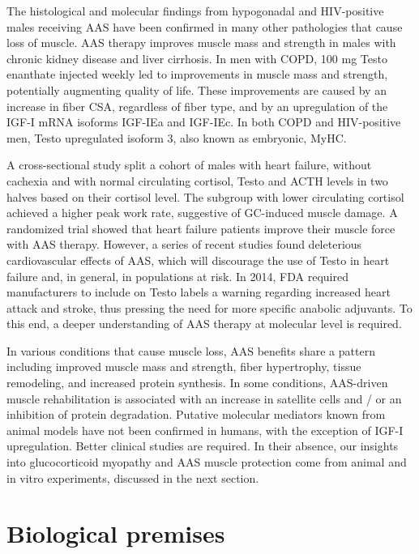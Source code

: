 \documentclass[12pt,english]{report}\usepackage[]{graphicx}\usepackage[]{color}
\begin{document}
The histological and molecular findings from hypogonadal and HIV-positive
males receiving AAS have been confirmed in many other pathologies
that cause loss of muscle. AAS therapy improves muscle mass and strength
in males with chronic kidney disease and liver cirrhosis\citep{macdonald2007nandrolone,yurci2011effects}.
In men with COPD, 100 mg Testo enanthate injected weekly led to improvements
in muscle mass and strength, potentially augmenting quality of life\citep{casaburi2004effects}.
These improvements are caused by an increase in fiber CSA, regardless
of fiber type, and by an upregulation of the IGF-I mRNA isoforms IGF-IEa
and IGF-IEc\citep{lewis2007skeletal}. In both COPD and HIV-positive
men, Testo upregulated isoform 3, also known as embryonic, MyHC.

A cross-sectional study split a cohort of males with heart failure,
without cachexia and with normal circulating cortisol, Testo and ACTH
levels in two halves based on their cortisol level. The subgroup with
lower circulating cortisol achieved a higher peak work rate, suggestive
of GC-induced muscle damage\citep{agapitou2013hormonal}. A randomized
trial showed that heart failure patients improve their muscle force
with AAS therapy\citep{mirdamadi2014beneficial,stout2012testosterone}.
However, a series of recent studies found deleterious cardiovascular
effects of AAS\citep{xu2013testosterone,basaria2010adverse}, which
will discourage the use of Testo in heart failure and, in general,
in populations at risk. In 2014, FDA required manufacturers to include
on Testo labels a warning regarding increased heart attack and stroke,
thus pressing the need for more specific anabolic adjuvants. To this
end, a deeper understanding of AAS therapy at molecular level is required.

In various conditions that cause muscle loss, AAS benefits share a
pattern including improved muscle mass and strength, fiber hypertrophy,
tissue remodeling, and increased protein synthesis. In some conditions,
AAS-driven muscle rehabilitation is associated with an increase in
satellite cells and / or an inhibition of protein degradation. Putative
molecular mediators known from animal models have not been confirmed
in humans, with the exception of IGF-I upregulation. Better clinical
studies are required. In their absence, our insights into glucocorticoid
myopathy and AAS muscle protection come from animal and in vitro experiments,
discussed in the next section.\pagebreak{}


\chapter{Biological premises}
\end{document}

